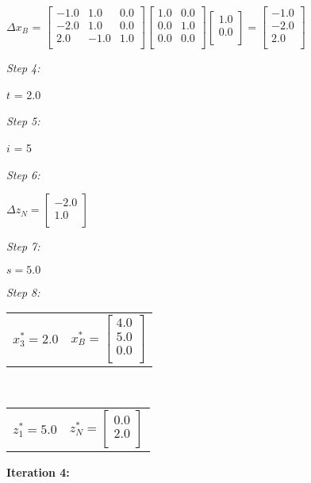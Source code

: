 \documentclass{article}
\begin{document}
\begin{center}$\Delta x_B$ = $\left[\begin{array}{ccc}-1.0 & 1.0 & 0.0\\ -2.0 & 1.0 & 0.0\\ 2.0 & -1.0 & 1.0\\ \end{array}\right]\left[\begin{array}{cc}1.0 & 0.0\\ 0.0 & 1.0\\ 0.0 & 0.0\\ \end{array}\right]\left[\begin{array}{c}1.0\\ 0.0\\ \end{array}\right] = \left[\begin{array}{c}-1.0\\ -2.0\\ 2.0\\ \end{array}\right]$\end{center}
\textit{Step 4:}\\
\begin{center}
$t$ = 2.0
\end{center}
\textit{Step 5:}\\
\begin{center}
$i$ = 5
\end{center}
\textit{Step 6:}\\
\begin{center}$\Delta z_N = \left[\begin{array}{c}-2.0\\ 1.0\\ \end{array}\right]$\end{center}
\textit{Step 7:}\\
\begin{center}$s = 5.0$\end{center}
\textit{Step 8:}\\
\begin{center}
\begin{tabular}{cc}$x_3^* = 2.0$ & $x_B^* = \left[\begin{array}{c}4.0\\ 5.0\\ 0.0\\ \end{array}\right]$\end{tabular}
\\
\begin{tabular}{cc}$z_1^* = 5.0$ & $z_N^* = \left[\begin{array}{c}0.0\\ 2.0\\ \end{array}\right]$\end{tabular}
\end{center}
\textbf{Iteration 4: }
\end{document}
